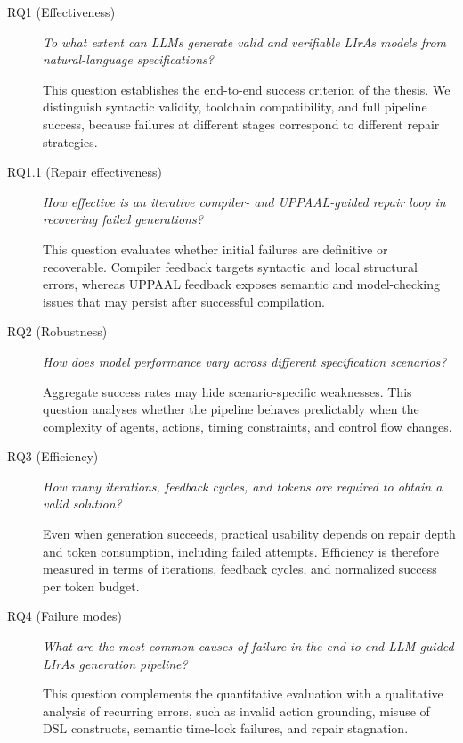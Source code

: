 \begin{description}
    \item[RQ1 (Effectiveness)] \textit{To what extent can LLMs generate valid and verifiable LIrAs models from natural-language specifications?}
    
    This question establishes the end-to-end success criterion of the thesis.
    We distinguish syntactic validity, toolchain compatibility, and full pipeline success, because failures at different stages correspond to different repair strategies.

    \item[RQ1.1 (Repair effectiveness)] \textit{How effective is an iterative compiler- and UPPAAL-guided repair loop in recovering failed generations?}
    
    This question evaluates whether initial failures are definitive or recoverable.
    Compiler feedback targets syntactic and local structural errors, whereas UPPAAL feedback exposes semantic and model-checking issues that may persist after successful compilation.

    \item[RQ2 (Robustness)] \textit{How does model performance vary across different specification scenarios?}
    
    Aggregate success rates may hide scenario-specific weaknesses.
    This question analyses whether the pipeline behaves predictably when the complexity of agents, actions, timing constraints, and control flow changes.

    \item[RQ3 (Efficiency)] \textit{How many iterations, feedback cycles, and tokens are required to obtain a valid solution?}
    
    Even when generation succeeds, practical usability depends on repair depth and token consumption, including failed attempts.
    Efficiency is therefore measured in terms of iterations, feedback cycles, and normalized success per token budget.

    \item[RQ4 (Failure modes)] \textit{What are the most common causes of failure in the end-to-end LLM-guided LIrAs generation pipeline?}
    
    This question complements the quantitative evaluation with a qualitative analysis of recurring errors, such as invalid action grounding, misuse of DSL constructs, semantic time-lock failures, and repair stagnation.
\end{description}

